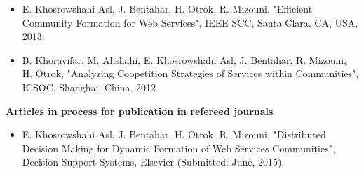 \begin{itemize}
\item E. Khosrowshahi Asl, J. Bentahar, H. Otrok, R. Mizouni, "Efficient Community Formation for Web Services", IEEE SCC, Santa Clara, CA, USA, 2013.

\item B. Khoravifar, M. Alishahi, E. Khosrowshahi Asl, J. Bentahar, R. Mizouni, H. Otrok, "Analyzing Coopetition Strategies of Services within Communities", ICSOC, Shanghai, China, 2012




\end{itemize}

\textbf{Articles in process for publication in refereed journals}

\begin{itemize}
\item E. Khosrowshahi Asl, J. Bentahar, H. Otrok, R. Mizouni, "Distributed Decision Making for Dynamic Formation of Web Services Communities", Decision Support Systems, Elsevier (Submitted: June, 2015).
\end{itemize}

